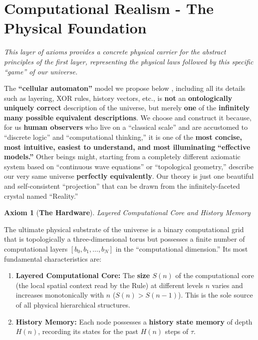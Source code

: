 \documentclass[11pt, a4paper]{article}
\newtheorem{axiom}{Axiom}[section]
\begin{document}
\section{Computational Realism - The Physical Foundation}
\textit{This layer of axioms provides a concrete physical carrier for the abstract principles of the first layer, representing the physical laws followed by this specific ``game'' of our universe.}

The \textbf{``cellular automaton''} model we propose below \cite{Wolfram2002}, including all its details such as layering, XOR rules, history vectors, etc., is \textbf{not} an \textbf{ontologically uniquely correct} description of the universe, but merely \textbf{one} of the \textbf{infinitely many possible equivalent descriptions}. We choose and construct it because, for us \textbf{human observers} who live on a ``classical scale'' and are accustomed to ``discrete logic'' and ``computational thinking,'' it is one of the \textbf{most concise, most intuitive, easiest to understand, and most illuminating} \textbf{``effective models.''} Other beings might, starting from a completely different axiomatic system based on ``continuous wave equations'' or ``topological geometry,'' describe our very same universe \textbf{perfectly equivalently}. Our theory is just one beautiful and self-consistent ``projection'' that can be drawn from the infinitely-faceted crystal named ``Reality.''

\begin{axiom}[\textbf{The Hardware}]
Layered Computational Core and History Memory
\end{axiom}
The ultimate physical substrate of the universe is a binary computational grid that is topologically a three-dimensional torus but possesses a finite number of computational layers $[b_0, b_1, \dots, b_N]$ in the ``computational dimension.'' Its most fundamental characteristics are:
\begin{enumerate}
    \item \textbf{Layered Computational Core:} The \textbf{size $S(n)$} of the computational core (the local spatial context read by the Rule) at different levels $n$ varies and increases monotonically with $n$ ($S(n) > S(n-1)$). This is the sole source of all physical hierarchical structures.
    \item \textbf{History Memory:} Each node possesses a \textbf{history state memory} of depth $H(n)$, recording its states for the past $H(n)$ steps of $\tau$.
\end{enumerate}
\end{document}
